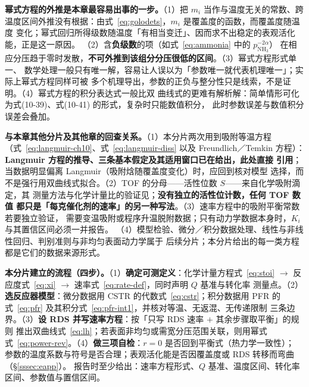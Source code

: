 \begin{pitfall}
\textbf{幂式方程的外推是本章最容易出事的一步。}（1）把 $m_i$ 当作与温度无关的常数、跨
温度区间外推没有根据：由式~\eqref{eq:golodets}，$m_i$ 是覆盖度的函数，而覆盖度随温度
变化；幂式回归所得级数随温度「有相当变迁」、因而求不出稳定的表观活化能，正是这一原因。
（2）含\textbf{负级数}的项（如式~\eqref{eq:ammonia} 中的 $p_{\mathrm{NH_3}}^{-2\alpha}$）
在相应分压趋于零时发散，\textbf{不可外推到该组分分压很低的区间}。（3）幂式方程形式单一、
数学处理一般只有唯一解，容易让人误以为「参数唯一就代表机理唯一」；实际上幂式方程同样可被
多个机理导出，参数的正负与整分性只是线索，不是证明。（4）幂式方程的积分表达式一般比双
曲线式的更难有解析解：简单情形可化为式(10-39)、式(10-41) 的形式，复杂时只能数值积分，
此时参数误差与数值积分误差会叠加。
\end{pitfall}

\begin{crosscheck}
\textbf{与本章其他分片及其他章的回查关系。}（1）本分片两次用到吸附等温方程
（式~\eqref{eq:langmuir-ch10}、式~\eqref{eq:langmuir-diss} 以及 Freundlich／Temkin 方程）：
\textbf{Langmuir 方程的推导、三条基本假定及其适用窗口已在给出，此处直接
引用}；当数据明显偏离 Langmuir（吸附焓随覆盖度变化）时，应回到核对模型
选择，而不是强行用双曲线式拟合。（2）TOF 的分母——活性位数 $S$——来自化学吸附滴定，其
测量方法与化学计量比的验证见；\textbf{没有独立的活性位计数，任何 TOF 数值
都只是「每克催化剂的速率」的另一种写法}。（3）速率方程中的吸附平衡常数若要独立验证，
需要变温吸附或程序升温脱附数据；只有动力学数据本身时，$K_i$ 与其置信区间必须一并报告。
（4）模型检验、微分／积分数据处理、线性与非线性回归、判别准则与非均匀表面动力学属于
后续分片；本分片给出的每一类方程都是它们的数据来源形式。
\end{crosscheck}

\begin{methodsum}
\textbf{本分片建立的流程（四步）。}（1）\textbf{确定可测定义}：化学计量方程式~\eqref{eq:stoi}
$\to$ 反应度式~\eqref{eq:xi} $\to$ 速率式~\eqref{eq:rate-def}，同时声明 $Q$ 基准与转化率
测量点。（2）\textbf{选反应器模型}：微分数据用 CSTR 的代数式~\eqref{eq:cstr}；积分数据用
PFR 的式~\eqref{eq:pfr} 及其积分式~\eqref{eq:pfr-int1}，并核对等温、无返混、无传递限制
三条边界。（3）\textbf{设 RDS 并写速率方程}：按「只写 RDS 速率 $+$ 其余步骤取平衡」的规则
推出双曲线式~\eqref{eq:lh}；若表面非均匀或需宽分压范围关联，则用幂式
式~\eqref{eq:power-rev}。（4）\textbf{做三项自检}：$r=0$ 是否回到平衡式（热力学一致性）；
参数的温度系数与符号是否合理；表观活化能是否因覆盖度或 RDS 转移而弯曲（§\ref{sssec:eapp}）。
报告时至少给出：速率方程形式、$Q$ 基准、温度区间、转化率区间、参数值与置信区间。
\end{methodsum}

